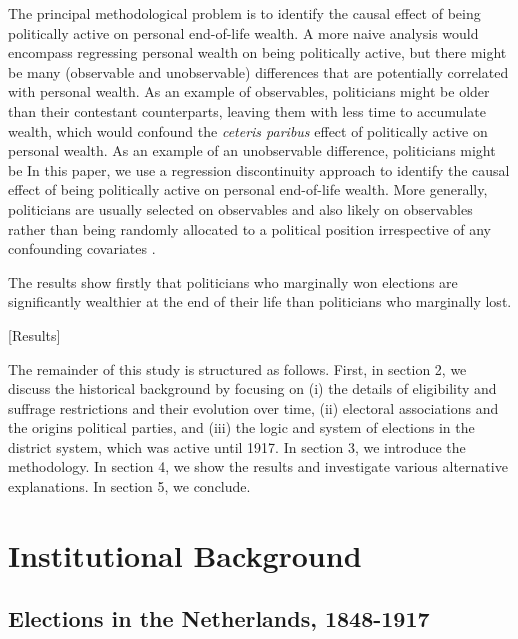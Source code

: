 \documentclass[12pt]{article}
\begin{document}
The principal methodological problem is to identify the causal effect of being politically active on personal end-of-life wealth. A more naive analysis would encompass regressing personal wealth on being politically active, but there might be many (observable and unobservable) differences that are potentially correlated with personal wealth. As an example of observables, politicians might be older than their contestant counterparts, leaving them with less time to accumulate wealth, which would confound the \textit{ceteris paribus} effect of politically active on personal wealth. As an example of an unobservable difference, politicians might be In this paper, we use a regression discontinuity approach to identify the causal effect of being politically active on personal end-of-life wealth. 
More generally, politicians are usually selected on observables and also likely on observables rather than being randomly allocated to a political position irrespective of any confounding covariates \citep{besley2005political}. 


The results show firstly that politicians who marginally won elections are significantly wealthier at the end of their life than politicians who marginally lost. 

\begin{center}
    [Results]
\end{center}

The remainder of this study is structured as follows. First, in section 2, we discuss the historical background by focusing on (i) the details of eligibility and suffrage restrictions and their evolution over time, (ii) electoral associations and the origins political parties, and (iii) the logic and system of elections in the district system, which was active until 1917. In section 3, we introduce the methodology. In section 4, we show the results and investigate various alternative explanations. In section 5, we conclude.  

\section{Institutional Background}

\subsection{Elections in the Netherlands, 1848-1917}
\end{document}
